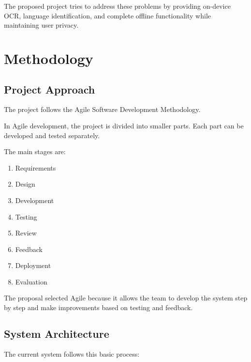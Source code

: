 \documentclass[12pt,a4paper]{report}
\begin{document}
The proposed project tries to address these problems by providing on-device OCR, language identification, and complete offline functionality while maintaining user privacy. \cite{ref5}


\chapter{Methodology}

\section{Project Approach}

The project follows the Agile Software Development Methodology.

In Agile development, the project is divided into smaller parts. Each part can be developed and tested separately.

The main stages are:

\begin{enumerate}
    \item Requirements
    \item Design
    \item Development
    \item Testing
    \item Review
    \item Feedback
    \item Deployment
    \item Evaluation
\end{enumerate}

The proposal selected Agile because it allows the team to develop the system step by step and make improvements based on testing and feedback. \cite{ref6}

\section{System Architecture}

The current system follows this basic process:
\end{document}
